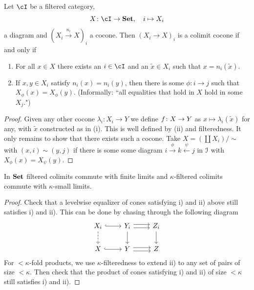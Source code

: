 \documentclass[a4paper,11pt,oneside,openany]{scrbook}
\begin{document}
\begin{thm}
	Let $\cI$ be a filtered category,
	\begin{displaymath}
		X\colon\cI\to\Set,\quad i\mapsto X_i
	\end{displaymath}
	a diagram and $(X_i\xrightarrow{n_i}X)_i$ a cocone.
	Then $(X_i\to X)_i$ is a colimit cocone if and only if
	\begin{enumerate}[label=\roman*)]
		\item For all $x\in X$ there exists an $i\in\cI$ and an $\tilde x\in
            X_i$ such that $x=n_i(\tilde x)$.
		\item If $ x , y \in X_i $ satisfy $ n_i(x) = n_i(y) $, then there is
            some $ \phi \colon i\to j $ such that $ X_\phi(x) = X_\phi(y) $.
            (Informally: ``all equalities that hold in $X$ hold in some $X_j$.")
	\end{enumerate}
\end{thm}
\begin{proof}
	Given any other cocone $ \lambda_i\colon X_i\to Y $
	we define $ f \colon X \to Y $ as $ x \mapsto \lambda_i (\tilde x) $ for any,
	with $\tilde x$ constructed as in (i).
	This is well defined by (ii) and filteredness.
	It only remains to show that there exists such a cocone.
	Take $X=(\coprod X_i) /\sim $ with $ (x,i) \sim (y,j) $ if there is some
    some diagram $ i \xrightarrow{\phi} k \xleftarrow{\psi}j $ in $ \operatorname{\mathcal{I}} $ with $
    X_\phi(x) = X_\psi(y) $.
\end{proof}
\begin{cor}
	In $ {\normalfont\textbf{Set}} $ filtered colimits commute with finite limits and $ \kappa
    $-filtered colimits commute with $ \kappa $-small limits.
\end{cor}
\begin{proof}
	Check that a levelwise equalizer of cones satisfying i) and ii) above still
    satisfies i) and ii).
	This can be done by chasing through the following diagram
	\begin{displaymath}
		\begin{tikzcd}
			X_i \arrow[d,dashed] \arrow[r, hook] & Y_i \arrow[d]\arrow[r, shift right]\arrow[r, shift left]& Z_i\arrow[d]\\
			X\arrow[r, hook] & Y \arrow[r, shift right]\arrow[r, shift left]& Z
		\end{tikzcd}
	\end{displaymath}
	For $ < \kappa $-fold products, we use $ \kappa $-filteredness to extend
    ii) to any set of pairs of size $ < \kappa $. Then check that the product of
    cones satisfying i) and ii) of size $ < \kappa $ still satisfies i) and ii).
\end{proof}
\end{document}
